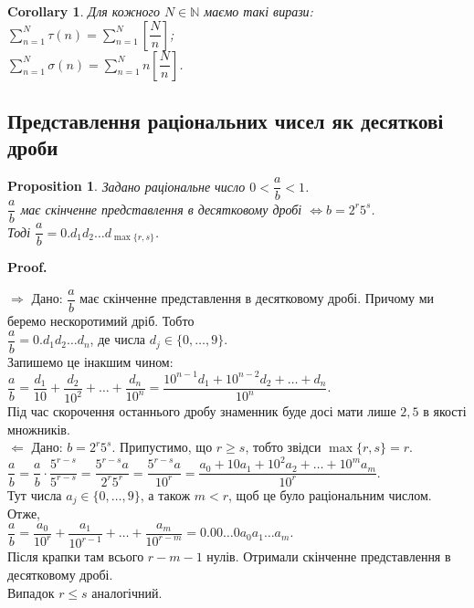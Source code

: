 \documentclass[a4paper, 14pt]{extarticle}
\makeatletter
\theoremstyle{theoremdd}
\theoremstyle{theoremdd}
\theoremstyle{theoremdd}
\theoremstyle{theoremdd}
\theoremstyle{theoremdd}
\newtheorem{proposition}[theorem]{Proposition}
\theoremstyle{theoremdd}
\theoremstyle{theoremdd}
\theoremstyle{theoremdd}
\newtheorem{corollary}[theorem]{Corollary}
\def\qed{$\blacksquare$}
\def\rightproof{$\boxed{\Rightarrow}$ }
\def\leftproof{$\boxed{\Leftarrow}$ }
\renewenvironment{proof}[1][Proof.\\]{\par
\pushQED{\hfill \qed}%
\normalfont \topsep6\p@\@plus6\p@\relax
\trivlist
\item\relax
{\bfseries
#1\@addpunct{.}}\hspace\labelsep\ignorespaces
}{%
\popQED\endtrivlist\@endpefalse
}
\makeatother
\begin{document}
\begin{corollary}
Для кожного $N \in \mathbb{N}$ маємо такі вирази:\\
$\displaystyle\sum_{n=1}^N \tau(n) = \sum_{n=1}^N \left[ \dfrac{N}{n} \right]$;\\
$\displaystyle\sum_{n=1}^N \sigma(n) = \sum_{n=1}^N n \left[ \dfrac{N}{n} \right]$.
\end{corollary}

\iffalse
\subsection{Представлення раціональних чисел як десяткові дроби}

\begin{proposition}
Задано раціональне число $0 < \dfrac{a}{b} < 1$.\\
$\dfrac{a}{b}$ має скінченне представлення в десятковому дробі $\iff b = 2^r 5^s$.\\
Тоді $\dfrac{a}{b} = 0.d_1d_2\dots d_{\max\{r,s\}}$.
\end{proposition}

\begin{proof}
\rightproof Дано: $\dfrac{a}{b}$ має скінченне представлення в десятковому дробі. Причому ми беремо нескоротимий дріб. Тобто\\
$\dfrac{a}{b} = 0.d_1d_2\dots d_n$, де числа $d_j \in \{0,\dots,9\}$.\\
Запишемо це інакшим чином:\\
$\dfrac{a}{b} = \dfrac{d_1}{10} + \dfrac{d_2}{10^2} + \dots + \dfrac{d_n}{10^n} = \dfrac{10^{n-1}d_1 + 10^{n-2}d_2 + \dots + d_n}{10^n}$.\\
Під час скорочення останнього дробу знаменник буде досі мати лише $2,5$ в якості множників.
\bigskip \\
\leftproof Дано: $b = 2^r 5^s$. Припустимо, що $r \geq s$, тобто звідси $\max \{r,s\} = r$.\\
$\dfrac{a}{b} = \dfrac{a}{b} \cdot \dfrac{5^{r-s}}{5^{r-s}} = \dfrac{5^{r-s}a}{2^r 5^r} = \dfrac{5^{r-s}a}{10^r} = \dfrac{a_0+10a_1+10^2a_2+\dots+10^ma_m}{10^r}$.\\
Тут числа $a_j \in \{0,\dots,9\}$, а також $m < r$, щоб це було раціональним числом. Отже,\\
$\dfrac{a}{b} = \dfrac{a_0}{10^r} + \dfrac{a_1}{10^{r-1}} + \dots + \dfrac{a_m}{10^{r-m}} = 0.00\dots 0a_0a_1\dots a_m$.\\
Після крапки там всього $r-m-1$ нулів. Отримали скінченне представлення в десятковому дробі.\\
Випадок $r \leq s$ аналогічний.
\end{proof}
\end{document}
